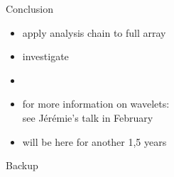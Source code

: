 \documentclass[8pt]{beamer}
\begin{document}
    \begin{frame}{Conclusion}{}
        {\Large
        \centering
        \begin{itemize}
            \item apply analysis chain to full array
            \item investigate
            \item[]
            \item for more information on wavelets:\\
                see Jérémie's talk in February
            \item will be here for another 1,5 years
        \end{itemize}
        }
    \end{frame}

    
    \setcounter{finalframe}{\value{framenumber}}

    
    
    
    
    \begin{frame}
        \centering
        \Huge Backup\\
    \end{frame}
\end{document}
